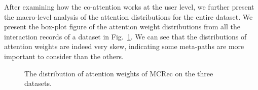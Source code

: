 After examining how the co-attention works at the user level, we further present the macro-level analysis of the attention distributions for the entire dataset.
We present the box-plot figure of the attention weight distributions from all the interaction records of a dataset in Fig.~\ref{fig-attention-distribution}.
We can see that  the distributions of attention weights are indeed very skew,  indicating some meta-paths are more important to consider than the others.

\begin{figure}[htbp]
\centering
{}
\caption{The distribution of attention weights of MCRec on the three datasets. \label{fig-attention-distribution}}
\end{figure}


